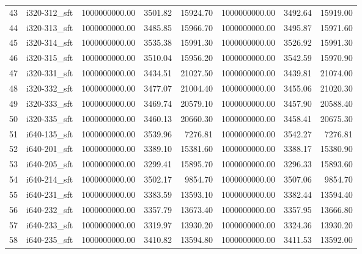 \begin{tabular}{llrrrrrr}
43 &  i320-312\_sft &    1000000000.00 &              3501.82 &       15924.70 &    1000000000.00 &              3492.64 &       15919.00 \\
44 &  i320-313\_sft &    1000000000.00 &              3485.85 &       15966.70 &    1000000000.00 &              3495.87 &       15971.60 \\
45 &  i320-314\_sft &    1000000000.00 &              3535.38 &       15991.30 &    1000000000.00 &              3526.92 &       15991.30 \\
46 &  i320-315\_sft &    1000000000.00 &              3510.04 &       15956.20 &    1000000000.00 &              3542.59 &       15970.90 \\
47 &  i320-331\_sft &    1000000000.00 &              3434.51 &       21027.50 &    1000000000.00 &              3439.81 &       21074.00 \\
48 &  i320-332\_sft &    1000000000.00 &              3477.07 &       21004.40 &    1000000000.00 &              3455.06 &       21020.30 \\
49 &  i320-333\_sft &    1000000000.00 &              3469.74 &       20579.10 &    1000000000.00 &              3457.90 &       20588.40 \\
50 &  i320-335\_sft &    1000000000.00 &              3460.13 &       20660.30 &    1000000000.00 &              3458.41 &       20675.30 \\
51 &  i640-135\_sft &    1000000000.00 &              3539.96 &        7276.81 &    1000000000.00 &              3542.27 &        7276.81 \\
52 &  i640-201\_sft &    1000000000.00 &              3389.10 &       15381.60 &    1000000000.00 &              3388.17 &       15380.90 \\
53 &  i640-205\_sft &    1000000000.00 &              3299.41 &       15895.70 &    1000000000.00 &              3296.33 &       15893.60 \\
54 &  i640-214\_sft &    1000000000.00 &              3502.17 &        9854.70 &    1000000000.00 &              3507.06 &        9854.70 \\
55 &  i640-231\_sft &    1000000000.00 &              3383.59 &       13593.10 &    1000000000.00 &              3382.44 &       13594.40 \\
56 &  i640-232\_sft &    1000000000.00 &              3357.79 &       13673.40 &    1000000000.00 &              3357.95 &       13666.80 \\
57 &  i640-233\_sft &    1000000000.00 &              3319.97 &       13930.20 &    1000000000.00 &              3324.36 &       13930.20 \\
58 &  i640-235\_sft &    1000000000.00 &              3410.82 &       13594.80 &    1000000000.00 &              3411.53 &       13592.00 \\
\bottomrule
\end{tabular}
